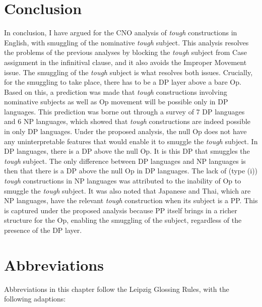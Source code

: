 \documentclass[output=paper]{langscibook}
\begin{document}
\section{Conclusion} \label{s4ha}
In conclusion, I have argued for the CNO analysis \citep{Hicks2009} of \textit{tough} constructions in English, with smuggling of the nominative \textit{tough} subject. This analysis resolves the problems of the previous analyses by blocking the \textit{tough} subject from Case assignment in the infinitival clause, and it also avoids the Improper Movement issue. The smuggling of the \textit{tough} subject is what resolves both issues. Crucially, for the smuggling to take place, there has to be a DP layer above a bare Op. Based on this, a prediction was made that \textit{tough} constructions involving nominative subjects as well as Op movement will be possible only in DP languages. This prediction was borne out through a survey of 7 DP languages and 6 NP languages, which showed that \textit{tough} constructions are indeed possible in only DP languages. Under the proposed analysis, the null Op does not have any uninterpretable features that would enable it to smuggle the \textit{tough} subject. In DP languages, there is a DP above the null Op. It is this DP that smuggles the \textit{tough} subject. The only difference between DP languages and NP languages is then that there is a DP above the null Op in DP languages. The lack of (type (i)) \textit{tough} constructions in NP languages was attributed to the inability of Op to smuggle the \textit{tough} subject. It was also noted that Japanese and Thai, which are NP languages, have the relevant \textit{tough} construction when its subject is a PP. This is captured under the proposed analysis because PP itself brings in a richer structure for the Op, enabling the smuggling of the subject, regardless of the presence of the DP layer. 

\section*{Abbreviations}

Abbreviations in this chapter follow the Leipzig Glossing Rules, with the following adaptions:
\end{document}
